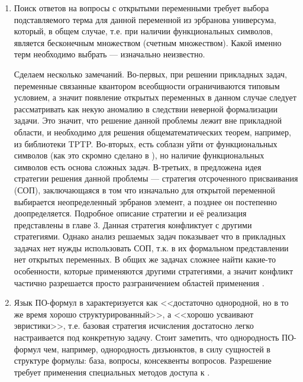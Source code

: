 \begin{enumerate}

\item Поиск ответов на вопросы с открытыми переменными требует выбора   подставляемого терма для данной переменной из эрбранова универсума,   который, в общем случае, т.е. при наличии функциональных символов, является бесконечным множеством (счетным множеством). Какой именно терм необходимо выбрать --- изначально неизвестно.

Сделаем несколько замечаний. Во-первых, при решении прикладных задач, переменные связанные квантором всеобщности ограничиваются типовым условием, а значит появление открытых переменных в данном случае следует рассматривать как некую аномалию в следствии неверной формализации задачи. Это значит, что решение данной проблемы лежит вне прикладной области, и необходимо для решения общематематических теорем, например, из библиотеки TPTP.  Во-вторых, есть соблазн уйти от функциональных символов (как это скромно сделано в \cite{Vas_ICDS}), но наличие функциональных символов есть основа сложных задач. В-третьих, в \cite{Vas_ICDS} предложена идея стратегии решения данной проблемы --- стратегия отсроченного присваивания (СОП), заключающаяся в том что изначально для открытой переменной выбирается неопределенный эрбранов элемент, а позднее он постепенно доопределяется. Подробное описание стратегии и её реализация представлены в главе 3. Данная стратегия конфликтует с другими стратегиями. Однако анализ решаемых задач показывает что в  прикладных задачах нет нужды использовать СОП, т.к. в их формальном представлении нет открытых переменных. В общих же задачах сложнее найти какие-то особенности, которые применяются другими стратегиями, а значит конфликт частично разрешается просто разграничением областей применения .

\item Язык ПО-формул в \cite{...} характеризуется как <<достаточно   однородной, но в то же время хорошо структурированный>>, а   <<хорошо усваивают эвристики>>, т.е. базовая стратегия исчисления достатосно легко настраивается под конкретную задачу. Стоит заметить, что однородность ПО-формул  чем, например, однородность дизъюнктов, в силу  сущностей в структуре формулы: база, вопросы, консеквенты вопросов. Разрешение  требует применения специальных методов доступа к .


\end{enumerate}
